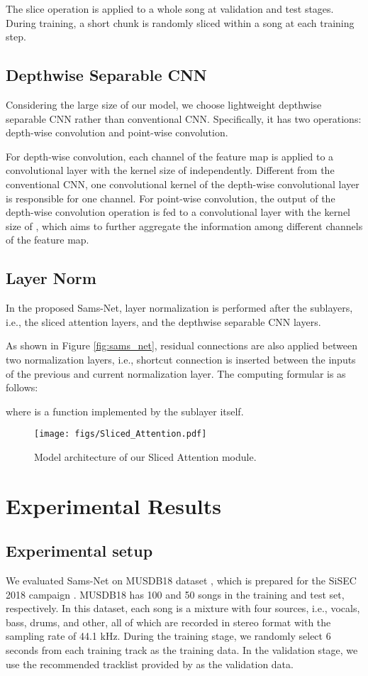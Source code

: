 \documentclass[a4paper]{article}
\begin{document}
The slice operation is applied to a whole song at validation and test stages. During training, a short chunk is randomly sliced within a song at each training step.

\subsection{Depthwise Separable CNN}
Considering the large size of our model, we choose lightweight depthwise separable CNN \cite{chollet2017xception} rather than conventional CNN. Specifically, it has two operations: depth-wise convolution and point-wise convolution.

For depth-wise convolution, each channel of the feature map is applied to a convolutional layer with the kernel size of  independently. Different from the conventional CNN, one convolutional kernel of the depth-wise convolutional layer is responsible for one channel. For point-wise convolution, the output of the depth-wise convolution operation is fed to a convolutional layer with the kernel size of , which aims to further aggregate the information among different channels of the feature map.

\subsection{Layer Norm}
In the proposed Sams-Net, layer normalization \cite{ba2016layer} is performed after the sublayers, i.e., the sliced attention layers, and the depthwise separable CNN layers.

As shown in Figure \ref{fig:sams_net}, residual connections are also applied between two normalization layers, i.e., shortcut connection is inserted between the inputs of the previous and current normalization layer. The computing formular is as follows:

where  is a function implemented by the sublayer itself.

\begin{figure}[tb]
  \centering
  \texttt{[image: figs/Sliced\_Attention.pdf]}
  \caption{Model architecture of our Sliced Attention module.}
  \label{fig:sliced_attention}
\end{figure}

\section{Experimental Results}

\subsection{Experimental setup}
We evaluated Sams-Net on MUSDB18 dataset \cite{rafii2017musdb18}, which is prepared for the SiSEC 2018 campaign \cite{stoter20182018}. MUSDB18 has 100 and 50 songs in the training and test set, respectively. In this dataset, each song is a mixture with four sources, i.e., vocals, bass, drums, and other, all of which are recorded in stereo format with the sampling rate of 44.1 kHz. During the training stage, we randomly select 6 seconds from each training track as the training data. In the validation stage, we use the recommended tracklist provided by \cite{rafii2017musdb18} as the validation data.
\end{document}
